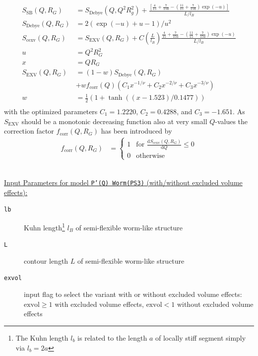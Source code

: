 \begin{align}
S_\textrm{SB}(Q,R_G) &= S_\mathrm{Debye}(Q,Q^2 R_g^2)+
    \frac{\left[\frac{4}{15} +\frac{7}{15u}-\left(\frac{11}{15}+\frac{7}{15u}\right)\exp(-u)\right]}{L/l_B}\\
S_\textrm{Debye}(Q,R_G) &= 2\left(\exp(-u)+u-1\right)/u^2\\
S_\textrm{cexv}(Q,R_G) &= S_\textrm{EXV}(Q,R_G)  +C\left(\frac{L}{l_B}\right)\frac{\frac{4}{15}+\frac{7}{15u}-\left(\frac{11}{15}+\frac{7}{15u}\right)\exp(-u)}{L/l_B} \\
u &= Q^2R_G^2 \\
x &= QR_G \\
S_\textrm{EXV}(Q,R_G) &= (1-w)S_\textrm{Debye}(Q,R_G) \\
&+ w f_\textrm{corr}(Q) \left(C_1x^{-1/\nu}+C_2x^{-2/\nu}+C_3x^{-3/\nu}\right) \nonumber \\
w &= \frac12\left(1+\tanh((x-1.523)/0.1477)\right) \\
\end{align}
with the optimized parameters $C_1 = 1.2220$, $C_2 = 0.4288$, and $C_3 = -1.651$.
As $S_\textrm{EXV}$ should be a monotonic decreasing function also at very small $Q$-values the correction factor $f_\textrm{corr}(Q,R_G)$ has been introduced by \cite{Chen2006} 
\begin{align}
f_\textrm{corr}(Q,R_G) &=
\begin{cases}
1 & \mbox{for~} \frac{\mathrm{d}S_\textrm{cexv}(Q,R_G)}{\mathrm{d}Q} \leq 0\\
0 & \mbox{otherwise}
\end{cases}
\end{align}
\vspace{5mm}

\hspace{1pt}\\
\underline{Input Parameters for model \texttt{P'(Q) Worm(PS3)} (with/without excluded volume effects):}\\
\begin{description}
\item[\texttt{lb}] Kuhn length\footnote{The Kuhn length $l_b$ is related to the length $a$ of
    locally stiff segment simply via $l_b=2a$} $l_B$ of semi-flexible worm-like structure
\item[\texttt{L}] contour length $L$ of semi-flexible worm-like structure
\item[\texttt{exvol}] input flag to select the variant with or without excluded volume effects: $\mathrm{exvol} \geq 1$ with excluded volume effects, $\mathrm{exvol} < 1$ without excluded volume effects
\end{description}

